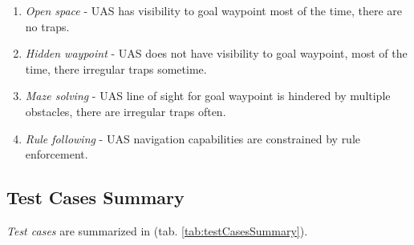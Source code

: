 \begin{enumerate}
    \item \emph{Open space} - UAS has visibility to goal waypoint most of the time, there are no traps.
    \item \emph{Hidden waypoint} - UAS does not have visibility to goal waypoint, most of the time, there irregular traps sometime.
    \item \emph{Maze solving} - UAS line of sight for goal waypoint is hindered by multiple obstacles, there are irregular traps often.
    \item \emph{Rule following} - UAS navigation capabilities are constrained by rule enforcement.
\end{enumerate}

\subsection{Test Cases Summary}\label{s:testCaseSummary}

\noindent \emph{Test cases} are summarized in (tab. \ref{tab:testCasesSummary}).

